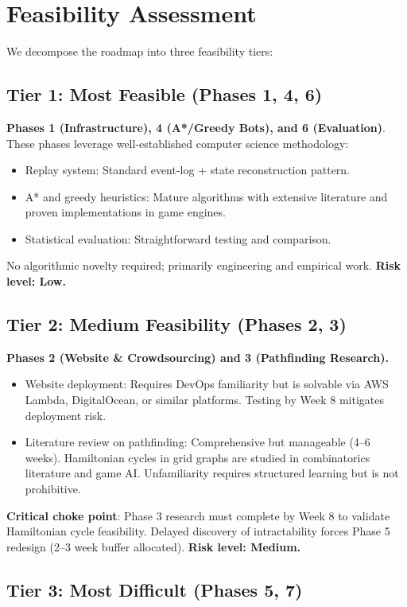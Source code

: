 \documentclass[11pt,a4paper]{article}
\begin{document}
\section{Feasibility Assessment}

We decompose the roadmap into three feasibility tiers:

\subsection*{Tier 1: Most Feasible (Phases 1, 4, 6)}

\textbf{Phases 1 (Infrastructure), 4 (A*/Greedy Bots), and 6 (Evaluation)}. These phases leverage well-established computer science methodology:
\begin{itemize}
    \item Replay system: Standard event-log + state reconstruction pattern.
    \item A* and greedy heuristics: Mature algorithms with extensive literature and proven implementations in game engines.
    \item Statistical evaluation: Straightforward testing and comparison.
\end{itemize}
No algorithmic novelty required; primarily engineering and empirical work. \textbf{Risk level: Low.}

\subsection*{Tier 2: Medium Feasibility (Phases 2, 3)}

\textbf{Phases 2 (Website \& Crowdsourcing) and 3 (Pathfinding Research).}
\begin{itemize}
    \item Website deployment: Requires DevOps familiarity but is solvable via AWS Lambda, DigitalOcean, or similar platforms. Testing by Week 8 mitigates deployment risk.
    \item Literature review on pathfinding: Comprehensive but manageable (4--6 weeks). Hamiltonian cycles in grid graphs are studied in combinatorics literature and game AI. Unfamiliarity requires structured learning but is not prohibitive.
\end{itemize}
\textbf{Critical choke point}: Phase 3 research must complete by Week 8 to validate Hamiltonian cycle feasibility. Delayed discovery of intractability forces Phase 5 redesign (2--3 week buffer allocated). \textbf{Risk level: Medium.}

\subsection*{Tier 3: Most Difficult (Phases 5, 7)}
\end{document}
